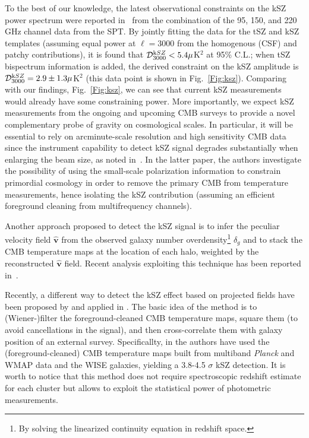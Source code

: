 To the best of our knowledge, the latest observational constraints on the kSZ power spectrum were reported in~\cite{George2015}  from the  combination of  the 95, 150, and 220 GHz channel data from the SPT. By jointly fitting the data for the tSZ and kSZ templates (assuming equal power at $\ell=3000$ from the homogenous (CSF) and patchy contributions), it is found that $\mathcal{D}^{\rm kSZ}_{3000} < 5.4 \mu$K$^2$ at 95\% C.L.; when tSZ bispectrum information is added, the derived constraint on the kSZ amplitude is  $\mathcal{D}^{\rm kSZ}_{3000} = 2.9 \pm 1.3\mu$K$^2$ (this data point is shown in Fig.~\eqref{Fig:ksz}). Comparing with our findings, Fig.~\eqref{Fig:ksz}, we can see that current kSZ measurements would already have  some constraining power. More importantly, we expect kSZ measurements   from the ongoing and upcoming CMB surveys to provide a novel complementary probe of gravity on cosmological scales. In particular, it will be essential to rely on arcminute-scale resolution and high sensitivity CMB data since the instrument capability to detect kSZ signal degrades substantially when enlarging the beam size, as noted in~\cite{Calabrese2014}. In the latter paper, the authors investigate the possibility of using the small-scale polarization information to constrain primordial cosmology in order to remove the primary CMB from temperature measurements, hence isolating the kSZ contribution (assuming an efficient foreground cleaning from multifrequency channels).

Another approach proposed to detect the kSZ signal is to infer the peculiar velocity field $\mathbf{\hat{v}}$ from the observed galaxy number overdensity\footnote{By solving the linearized continuity equation in redshift space.} $\delta_g$ and to stack the CMB temperature maps at the location of each halo, weighted by the reconstructed  $\mathbf{\hat{v}}$ field. Recent analysis exploiting this technique has been reported in~\cite{Adam2016,Schaan2016}.

Recently, a different way to detect the kSZ effect based on projected fields have been proposed by \cite{Ferraro2016} and applied in \cite{Hill2016}. The basic idea of the method is to (Wiener-)filter the foreground-cleaned \gls{CMB} temperature maps, square them (to avoid cancellations in the signal), and then cross-correlate them 
with galaxy position of an external survey. Specificallty, in \cite{Hill2016} the authors have used the (foreground-cleaned) \gls{CMB} temperature maps built from multiband \textit{Planck} and WMAP data and the WISE galaxies, yielding a 3.8-4.5 $\sigma$ kSZ detection. It is worth to notice that this method does not require spectroscopic redshift estimate for each cluster but allows to exploit the statistical power of photometric measurements.

